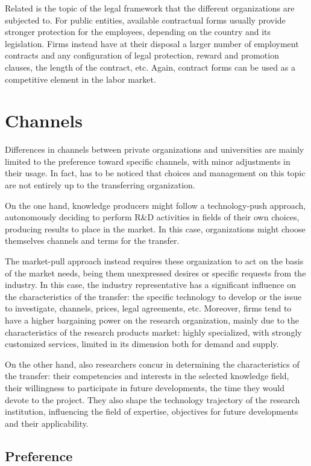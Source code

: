 Related is the topic of the legal framework that the different organizations are subjected to. For public entities, available contractual forms usually provide stronger protection for the employees, depending on the country and its legislation. Firms instead have at their disposal a larger number of employment contracts and any configuration of legal protection, reward and promotion clauses, the length of the contract, etc. Again, contract forms can be used as a competitive element in the labor market. 

\section{Channels}

Differences in channels between private organizations and universities are mainly limited to the preference toward specific channels, with minor adjustments in their usage. In fact, has to be noticed that choices and management on this topic are not entirely up to the transferring organization. 

On the one hand, knowledge producers might follow a technology-push approach, autonomously deciding to perform R\&D activities in fields of their own choices, producing results to place in the market. In this case, organizations might choose themselves channels and terms for the transfer.

The market-pull approach instead requires these organization to act on the basis of the market needs, being them unexpressed desires or specific requests from the industry. In this case, the industry representative has a significant influence on the characteristics of the transfer: the specific technology to develop or the issue to investigate, channels, prices, legal agreements, etc. Moreover, firms tend to have a higher bargaining power on the research organization, mainly due to the characteristics of the research products market: highly specialized, with strongly customized services, limited in its dimension both for demand and supply.

On the other hand, also researchers concur in determining the characteristics of the transfer: their competencies and interests in the selected knowledge field, their willingness to participate in future developments, the time they would devote to the project. They also shape the technology trajectory of the research institution, influencing the field of expertise, objectives for future developments and their applicability.

\subsection{Preference}

